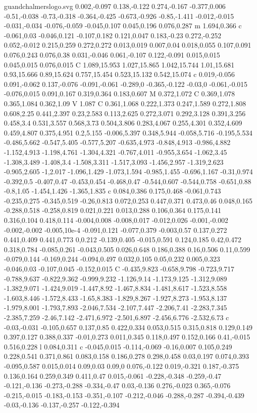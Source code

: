 \begin{filecontents}[noheader]{guandchalmerslogo.svg}
0.002,-0.097 0.138,-0.122 0.274,-0.167 -0.377,0.006 -0.51,-0.038 -0.73,-0.318 -0.364,-0.425 -0.673,-0.926 -0.85,-1.411 -0.012,-0.015 -0.031,-0.034 -0.076,-0.059 -0.045,0.107 0.045,0.196 0.076,0.287 m 1.694,0.366 c -0.061,0.03 -0.046,0.121 -0.107,0.182 0.121,0.047 0.183,-0.23 0.272,-0.252 0.052,-0.012 0.215,0.259 0.272,0.272 0.013,0.019 0.007,0.04 0.018,0.055 0.107,0.091 0.076,0.243 0.076,0.38 0.031,-0.046 0.061,-0.107 0.122,-0.091 0.015,0.015 0.045,0.015 0.076,0.015 C 1.089,15.953 1.027,15.865 1.042,15.744 1.01,15.681 0.93,15.666 0.89,15.624 0.757,15.454 0.523,15.132 0.542,15.074 c 0.019,-0.056 0.091,-0.062 0.137,-0.076 -0.091,-0.061 -0.289,0 -0.365,-0.122 -0.03,0 -0.061,-0.015 -0.076,0.015 0.091,0.167 0.319,0.364 0.183,0.607 M 0.372,1.072 C 0.369,1.078 0.365,1.084 0.362,1.09 V 1.087 C 0.361,1.068 0.222,1.373 0.247,1.589 0.272,1.808 0.608,2.25 0.441,2.397 0.23,2.583 0.113,2.625 0.272,3.071 0.292,3.128 0.391,3.256 0.458,3.4 0.531,3.557 0.568,3.73 0.504,3.806 0.283,4.067 0.255,4.301 0.352,4.609 0.459,4.807 0.375,4.951 0.2,5.155 -0.006,5.397 0.348,5.944 -0.058,5.716 -0.195,5.534 -0.486,5.662 -0.547,5.405 -0.577,5.207 -0.635,4.973 -0.848,4.913 -0.986,4.882 -1.152,4.913 -1.198,4.761 -1.304,4.321 -0.767,4.011 -0.955,3.654 -1.062,3.45 -1.308,3.489 -1.408,3.4 -1.508,3.311 -1.517,3.093 -1.456,2.957 -1.319,2.623 -0.905,2.605 -1,2.017 -1.096,1.429 -1.073,1.594 -0.985,1.455 -0.696,1.167 -0.31,0.974 -0.392,0.5 -0.407,0.47 -0.453,0.454 -0.468,0.47 -0.544,0.607 -0.544,0.758 -0.651,0.88 -0.8,1.05 -1.454,1.426 -1.365,1.835 c 0.084,0.386 0.175,0.468 -0.061,0.743 -0.235,0.275 -0.345,0.519 -0.26,0.813 0.072,0.253 0.447,0.371 0.473,0.46 0.048,0.165 -0.288,0.518 -0.258,0.819 0.021,0.221 0.013,0.288 0.106,0.364 0.175,0.141 0.316,0.104 0.418,0.114 -0.004,0.008 -0.008,0.017 -0.012,0.026 -0.001,-0.002 -0.002,-0.002 -0.005,10e-4 -0.091,0.121 -0.077,0.379 -0.003,0.57 0.137,0.272 0.441,0.409 0.441,0.773 0,0.212 -0.139,0.405 -0.015,0.591 0.124,0.185 0.42,0.472 0.318,0.784 -0.085,0.261 -0.043,0.505 0.026,0.648 0.186,0.388 0.16,0.506 0.11,0.599 -0.079,0.144 -0.169,0.244 -0.094,0.497 0.032,0.105 0.05,0.232 0.005,0.323 -0.046,0.03 -0.107,0.045 -0.152,0.015 C -0.435,9.823 -0.658,9.798 -0.723,9.717 -0.788,9.637 -0.822,9.362 -0.999,9.232 -1.126,9.14 -1.173,9.125 -1.312,9.089 -1.382,9.071 -1.424,9.019 -1.447,8.92 -1.467,8.834 -1.481,8.617 -1.523,8.558 -1.603,8.446 -1.572,8.433 -1.65,8.383 -1.829,8.267 -1.927,8.273 -1.953,8.137 -1.979,8.001 -1.793,7.893 -2.046,7.534 -2.107,7.447 -2.206,7.41 -2.283,7.345 -2.385,7.259 -2.46,7.142 -2.471,6.972 -2.501,6.897 -2.456,6.776 -2.532,6.73 c -0.03,-0.031 -0.105,0.657 0.137,0.85 0.422,0.334 0.053,0.515 0.315,0.818 0.129,0.149 0.397,0.127 0.388,0.337 -0.01,0.273 0.011,0.345 0.118,0.497 0.152,0.166 0.41,-0.015 0.516,0.228 l 0.084,0.311 c -0.045,0.015 -0.114,-0.069 -0.16,0.007 0.105,0.249 0.228,0.541 0.371,0.861 0.083,0.158 0.186,0.278 0.298,0.458 0.03,0.197 0.074,0.393 -0.095,0.587 0.015,0.014 0.09,0.03 0.09,0 0.076,-0.122 0.019,-0.321 0.187,-0.375 0.136,0.164 0.259,0.349 0.411,0.47 0.015,-0.061 -0.228,-0.348 -0.259,-0.47 -0.121,-0.136 -0.273,-0.288 -0.334,-0.47 0.03,-0.136 0.276,-0.023 0.365,-0.076 -0.215,-0.015 -0.183,-0.153 -0.351,-0.107 -0.212,-0.046 -0.288,-0.287 -0.394,-0.439 -0.03,-0.136 -0.137,-0.257 -0.122,-0.394 
\end{filecontents}
